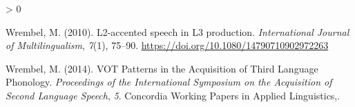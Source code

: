 \documentclass[
  english,
  man]{apa6}
\newlength{\cslhangindent}
\newenvironment{CSLReferences}[2] %
 {%
  \setlength{\parindent}{0pt}
  \ifodd #1 \everypar{\setlength{\hangindent}{\cslhangindent}}\ignorespaces\fi
  \ifnum #2 > 0
  \setlength{\parskip}{#2\baselineskip}
  \fi
 }%
 {}
\begin{document}
\begin{CSLReferences}{1}{0}
\leavevmode\hypertarget{ref-wrembel_l2-accented_2010}{}%
Wrembel, M. (2010). L2-accented speech in {L3} production. \emph{International Journal of Multilingualism}, \emph{7}(1), 75--90. \url{https://doi.org/10.1080/14790710902972263}

\leavevmode\hypertarget{ref-wrembel_vot_2014}{}%
Wrembel, M. (2014). {VOT} {Patterns} in the {Acquisition} of {Third} {Language} {Phonology}. \emph{Proceedings of the {International} {Symposium} on the {Acquisition} of {Second} {Language} {Speech}}, \emph{5}. Concordia Working Papers in Applied Linguistics,.

\end{CSLReferences}

\endgroup
\end{document}
